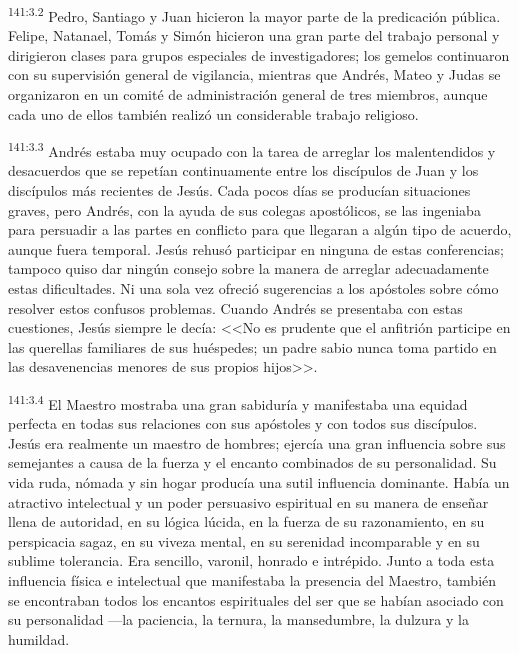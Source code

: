 \par 
\textsuperscript{141:3.2} Pedro, Santiago y Juan hicieron la mayor parte de la predicación pública. Felipe, Natanael, Tomás y Simón hicieron una gran parte del trabajo personal y dirigieron clases para grupos especiales de investigadores; los gemelos continuaron con su supervisión general de vigilancia, mientras que Andrés, Mateo y Judas se organizaron en un comité de administración general de tres miembros, aunque cada uno de ellos también realizó un considerable trabajo religioso.

\par 
\textsuperscript{141:3.3} Andrés estaba muy ocupado con la tarea de arreglar los malentendidos y desacuerdos que se repetían continuamente entre los discípulos de Juan y los discípulos más recientes de Jesús. Cada pocos días se producían situaciones graves, pero Andrés, con la ayuda de sus colegas apostólicos, se las ingeniaba para persuadir a las partes en conflicto para que llegaran a algún tipo de acuerdo, aunque fuera temporal. Jesús rehusó participar en ninguna de estas conferencias; tampoco quiso dar ningún consejo sobre la manera de arreglar adecuadamente estas dificultades. Ni una sola vez ofreció sugerencias a los apóstoles sobre cómo resolver estos confusos problemas. Cuando Andrés se presentaba con estas cuestiones, Jesús siempre le decía: <<No es prudente que el anfitrión participe en las querellas familiares de sus huéspedes; un padre sabio nunca toma partido en las desavenencias menores de sus propios hijos>>.

\par 
\textsuperscript{141:3.4} El Maestro mostraba una gran sabiduría y manifestaba una equidad perfecta en todas sus relaciones con sus apóstoles y con todos sus discípulos. Jesús era realmente un maestro de hombres; ejercía una gran influencia sobre sus semejantes a causa de la fuerza y el encanto combinados de su personalidad. Su vida ruda, nómada y sin hogar producía una sutil influencia dominante. Había un atractivo intelectual y un poder persuasivo espiritual en su manera de enseñar llena de autoridad, en su lógica lúcida, en la fuerza de su razonamiento, en su perspicacia sagaz, en su viveza mental, en su serenidad incomparable y en su sublime tolerancia. Era sencillo, varonil, honrado e intrépido. Junto a toda esta influencia física e intelectual que manifestaba la presencia del Maestro, también se encontraban todos los encantos espirituales del ser que se habían asociado con su personalidad ---la paciencia, la ternura, la mansedumbre, la dulzura y la humildad.

